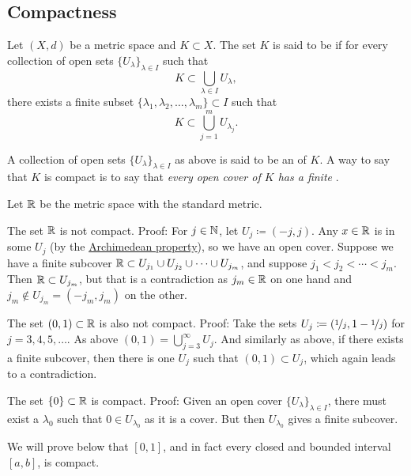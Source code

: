 \subsection{Compactness}

\begin{defn}
Let $(X,d)$ be a metric space and $K \subset X$. 
The set $K$ is said to be \emph{}
if for every collection
of open sets $\{ U_{\lambda} \}_{\lambda \in I}$ such that
\begin{equation*}
K \subset \bigcup_{\lambda \in I} U_\lambda ,
\end{equation*}
there exists a finite subset
$\{ \lambda_1, \lambda_2,\ldots,\lambda_m \} \subset I$
such that
\begin{equation*}
K \subset \bigcup_{j=1}^m U_{\lambda_j} .
\end{equation*}
\end{defn}

A collection of open sets $\{ U_{\lambda} \}_{\lambda \in I}$ as above is
said to be an \emph{} of $K$.  A way to say that
$K$ is compact is to say that \emph{every open cover of $K$ has a finite
}.

\begin{example}
Let ${\mathbb{R}}$ be the metric space with the standard metric.

The set ${\mathbb{R}}$ is not compact.  Proof: For $j \in {\mathbb{N}}$, let $U_j \coloneqq (-j,j)$.
Any $x \in {\mathbb{R}}$ is in some $U_j$ (by the
\hyperref[thm:arch:i]{Archimedean property}), so we have an open cover.
Suppose we have a finite
subcover ${\mathbb{R}} \subset U_{j_1} \cup U_{j_2} \cup \cdots \cup U_{j_m}$,
and suppose $j_1 < j_2 < \cdots < j_m$.  Then ${\mathbb{R}} \subset U_{j_m}$, but that is
a contradiction as $j_m \in {\mathbb{R}}$ on one hand and $j_m \notin U_{j_m} =
(-j_m,j_m)$ on the
other.

The set $(0,1) \subset {\mathbb{R}}$ is also not compact.  Proof:  Take the 
sets $U_{j} \coloneqq (\nicefrac{1}{j},1-\nicefrac{1}{j})$ for $j=3,4,5,\ldots$.
As above $(0,1) = \bigcup_{j=3}^\infty U_j$.  And similarly as above,
if there exists a finite subcover, then there is one $U_j$ such that $(0,1)
\subset U_j$, which again leads to a contradiction.

The set $\{ 0 \} \subset {\mathbb{R}}$ is compact.  Proof: Given an open cover $\{
U_{\lambda} \}_{\lambda \in I}$, there must exist a $\lambda_0$ such that $0
\in U_{\lambda_0}$ as it is a cover.  But then $U_{\lambda_0}$ gives a
finite subcover.

We will prove below that $[0,1]$, and in fact every closed and bounded
interval $[a,b]$, is compact.
\end{example}

